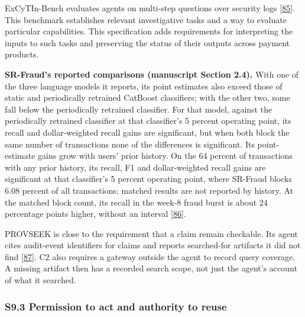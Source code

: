 \documentclass[
  11pt,
]{article}
\begin{document}
ExCyTIn-Bench evaluates agents on multi-step questions over security
logs {[}\protect\hyperlink{ref-Wu2026ExCyTIn}{85}{]}. This benchmark
establishes relevant investigative tasks and a way to evaluate
particular capabilities. This specification adds requirements for
interpreting the inputs to such tasks and preserving the status of their
outputs across payment products.

\textbf{SR-Fraud's reported comparisons (manuscript Section 2.4).} With
one of the three language models it reports, its point estimates also
exceed those of static and periodically retrained CatBoost classifiers;
with the other two, some fall below the periodically retrained
classifier. For that model, against the periodically retrained
classifier at that classifier's 5 percent operating point, its recall
and dollar-weighted recall gains are significant, but when both block
the same number of transactions none of the differences is significant.
Its point-estimate gains grow with users' prior history. On the 64
percent of transactions with any prior history, its recall, F1 and
dollar-weighted recall gains are significant at that classifier's 5
percent operating point, where SR-Fraud blocks 6.08 percent of all
transactions; matched results are not reported by history. At the
matched block count, its recall in the week-8 fraud burst is about 24
percentage points higher, without an interval
{[}\protect\hyperlink{ref-Tan2026SRFraud}{86}{]}.

PROVSEEK is close to the requirement that a claim remain checkable. Its
agent cites audit-event identifiers for claims and reports searched-for
artifacts it did not find
{[}\protect\hyperlink{ref-Mukherjee2025PROVSEEK}{87}{]}. C2 also
requires a gateway outside the agent to record query coverage. A missing
artifact then has a recorded search scope, not just the agent's account
of what it searched.

\hypertarget{s9.3-permission-to-act-and-authority-to-reuse}{%
\subsubsection{S9.3 Permission to act and authority to
reuse}\label{s9.3-permission-to-act-and-authority-to-reuse}}
\end{document}
